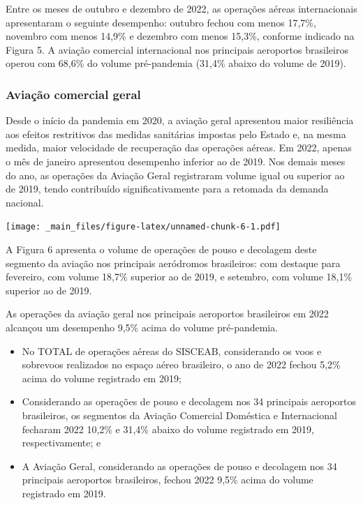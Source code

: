 \documentclass[
]{book}
\providecommand{\tightlist}{%
  \setlength{\itemsep}{0pt}\setlength{\parskip}{0pt}}
\begin{document}
Entre os meses de outubro e dezembro de 2022, as operações aéreas internacionais apresentaram o seguinte desempenho: outubro fechou com menos 17,7\%, novembro com menos 14,9\% e dezembro com menos 15,3\%, conforme indicado na Figura 5. A aviação comercial internacional nos principais aeroportos brasileiros operou com 68,6\% do volume pré-pandemia (31,4\% abaixo do volume de 2019).

\hypertarget{aviauxe7uxe3o-comercial-geral}{%
\subsubsection{Aviação comercial geral}\label{aviauxe7uxe3o-comercial-geral}}

Desde o início da pandemia em 2020, a aviação geral apresentou maior resiliência aos efeitos restritivos das medidas sanitárias impostas pelo Estado e, na mesma medida, maior velocidade de recuperação das operações aéreas. Em 2022, apenas o mês de janeiro apresentou desempenho inferior ao de 2019. Nos demais meses do ano, as operações da Aviação Geral registraram volume igual ou superior ao de 2019, tendo contribuído significativamente para a retomada da demanda nacional.

\texttt{[image: \_main\_files/figure-latex/unnamed-chunk-6-1.pdf]}

A Figura 6 apresenta o volume de operações de pouso e decolagem deste segmento da aviação nos principais aeródromos brasileiros: com destaque para fevereiro, com volume 18,7\% superior ao de 2019, e setembro, com volume 18,1\% superior ao de 2019.

As operações da aviação geral nos principais aeroportos brasileiros em 2022 alcançou um desempenho 9,5\% acima do volume pré-pandemia.

\begin{itemize}
\tightlist
\item
  No TOTAL de operações aéreas do SISCEAB, considerando os voos e sobrevoos realizados no espaço aéreo brasileiro, o ano de 2022 fechou 5,2\% acima do volume registrado em 2019;
\item
  Considerando as operações de pouso e decolagem nos 34 principais aeroportos brasileiros, os segmentos da Aviação Comercial Doméstica e Internacional fecharam 2022 10,2\% e 31,4\% abaixo do volume registrado em 2019, respectivamente; e
\item
  A Aviação Geral, considerando as operações de pouso e decolagem nos 34 principais aeroportos brasileiros, fechou 2022 9,5\% acima do volume registrado em 2019.
\end{itemize}
\end{document}

